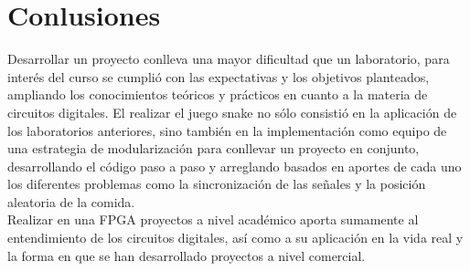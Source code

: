 \documentclass[10pt]{article}
\begin{document}
\section{Conlusiones}
Desarrollar un proyecto conlleva una mayor dificultad que un laboratorio, para interés del curso se cumplió con las expectativas y los objetivos planteados, ampliando los conocimientos teóricos y prácticos en cuanto a la materia de circuitos digitales. El realizar el juego snake no sólo consistió en la aplicación de los laboratorios anteriores, sino también en la implementación como equipo de una estrategia de modularización para conllevar un proyecto en conjunto, desarrollando el código paso a paso y arreglando basados en aportes de cada uno los diferentes problemas como la sincronización de las señales y la posición aleatoria de la comida. \\
Realizar en una FPGA proyectos a nivel académico aporta sumamente al entendimiento de los circuitos digitales, así como a su aplicación en la vida real y la forma en que se han desarrollado proyectos a nivel comercial.



\end{document}
